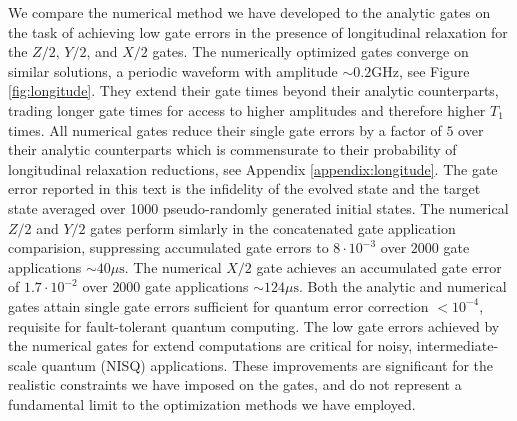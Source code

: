 We compare the numerical method we have developed to the analytic gates
on the task of achieving low gate errors in the presence of longitudinal relaxation
for the $Z/2$, $Y/2$, and $X/2$ gates.
The numerically optimized gates converge on similar solutions, a periodic
waveform with amplitude $\sim 0.2 \textrm{GHz}$, see Figure \ref{fig:longitude}.
They extend their gate times
beyond their analytic counterparts, trading longer gate times for access
to higher amplitudes and therefore higher $T_{1}$ times. All numerical gates reduce
their single gate errors by a factor of $5$ over
their analytic counterparts which is commensurate to their
probability of longitudinal relaxation reductions, see Appendix \ref{appendix:longitude}.
The gate error reported in this text is the infidelity
of the evolved state and the target state averaged over 1000 pseudo-randomly
generated initial states. The numerical $Z/2$ and $Y/2$ gates perform simlarly in
the concatenated gate application comparision, suppressing accumulated gate errors to $8 \cdot 10^{-3}$
over $2000$ gate applications $\sim 40 \mu\textrm{s}$. The numerical $X/2$ gate
achieves an accumulated gate error of $1.7 \cdot 10^{-2}$ over $2000$ gate applications $\sim 124 \mu\textrm{s}$.
Both the analytic and numerical gates attain single gate errors sufficient for
quantum error correction $< 10^{-4}$, requisite for fault-tolerant quantum computing.
The low gate errors achieved by the numerical gates  
for extend computations
are critical for noisy, intermediate-scale quantum (NISQ) applications.
These improvements are significant for the realistic constraints we have imposed
on the gates, and do not represent a fundamental limit to the optimization methods we have
employed.

